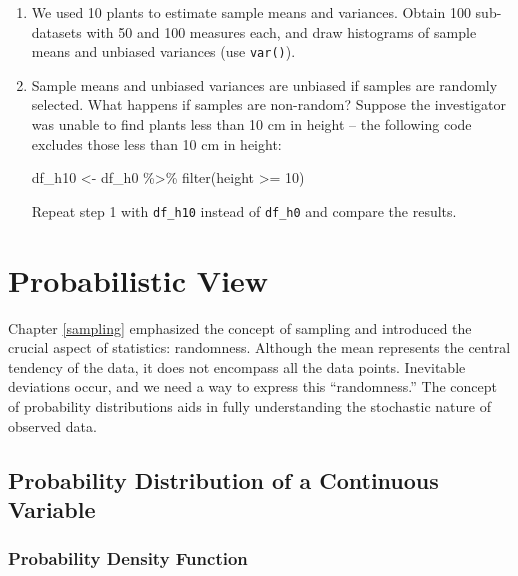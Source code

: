 \documentclass[
]{article}
\newenvironment{Shaded}{\begin{snugshade}}{\end{snugshade}}
\newcommand{\DecValTok}[1]{\textcolor[rgb]{0.00,0.00,0.81}{#1}}
\newcommand{\FunctionTok}[1]{\textcolor[rgb]{0.00,0.00,0.00}{#1}}
\newcommand{\NormalTok}[1]{#1}
\newcommand{\OtherTok}[1]{\textcolor[rgb]{0.56,0.35,0.01}{#1}}
\newcommand{\SpecialCharTok}[1]{\textcolor[rgb]{0.00,0.00,0.00}{#1}}
\begin{document}
\begin{enumerate}
\def\labelenumi{\arabic{enumi}.}
\item
  We used 10 plants to estimate sample means and variances. Obtain 100 sub-datasets with 50 and 100 measures each, and draw histograms of sample means and unbiased variances (use \texttt{var()}).
\item
  Sample means and unbiased variances are unbiased if samples are randomly selected. What happens if samples are non-random? Suppose the investigator was unable to find plants less than 10 cm in height -- the following code excludes those less than 10 cm in height:

\begin{Shaded}
\begin{Highlighting}[]
\NormalTok{df\_h10 }\OtherTok{\textless{}{-}}\NormalTok{ df\_h0 }\SpecialCharTok{\%\textgreater{}\%} 
  \FunctionTok{filter}\NormalTok{(height }\SpecialCharTok{\textgreater{}=} \DecValTok{10}\NormalTok{)}
\end{Highlighting}
\end{Shaded}

  Repeat step 1 with \texttt{df\_h10} instead of \texttt{df\_h0} and compare the results.
\end{enumerate}

\hypertarget{probabilistic-view}{%
\section{Probabilistic View}\label{probabilistic-view}}

Chapter \ref{sampling} emphasized the concept of sampling and introduced the crucial aspect of statistics: randomness. Although the mean represents the central tendency of the data, it does not encompass all the data points. Inevitable deviations occur, and we need a way to express this ``randomness.'' The concept of probability distributions aids in fully understanding the stochastic nature of observed data.

\hypertarget{probability-distribution-of-a-continuous-variable}{%
\subsection{Probability Distribution of a Continuous Variable}\label{probability-distribution-of-a-continuous-variable}}

\hypertarget{probability-density-function}{%
\subsubsection{Probability Density Function}\label{probability-density-function}}
\end{document}
